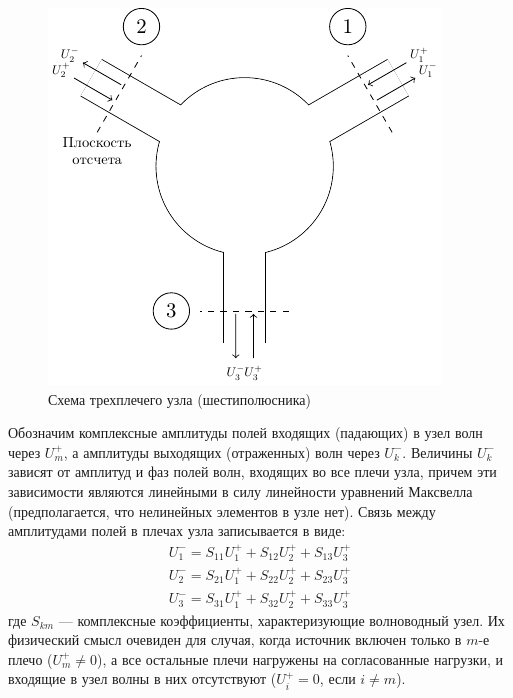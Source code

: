 ﻿\documentclass[a4paper,11pt]{article}
\begin{document}
\begin{figure}[h!]
	\centering
	\includegraphics[scale=1.5]{ris/ris1}
	\caption{Схема трехплечего узла (шестиполюсника)}
	\label{fig:figure1}
\end{figure}

Обозначим комплексные амплитуды полей входящих (падающих) в узел волн через $U_m^+$, а амплитуды выходящих (отраженных) волн через $U_k^-$. 
Величины $U_k^-$ зависят от амплитуд и фаз полей волн, входящих во все плечи узла, причем эти зависимости являются линейными в силу линейности уравнений Максвелла (предполагается, что нелинейных элементов в узле нет). 
Связь между амплитудами полей в плечах узла записывается в виде:
\begin{equation}
	\begin{array} { l } { U _ { 1 } ^ { - } = S _ { 11 } U _ { 1 } ^ { + } + S _ { 12 } U _ { 2 } ^ { + } + S _ { 13 } U _ { 3 } ^ { + } } \\ { U _ { 2 } ^ { - } = S _ { 21 } U _ { 1 } ^ { + } + S _ { 22 } U _ { 2 } ^ { + } + S _ { 23 } U _ { 3 } ^ { + } } \\ { U _ { 3 } ^ { - } = S _ { 31 } U _ { 1 } ^ { + } + S _ { 32 } U _ { 2 } ^ { + } + S _ { 33 } U _ { 3 } ^ { + } } \end{array}
\end{equation}
где $S_{km}$ ---  комплексные коэффициенты, характеризующие волноводный узел. 
Их физический смысл очевиден для случая, когда источник включен только в $m$-е плечо ($U_m^+\ne0$), а все остальные плечи нагружены на согласованные нагрузки, и входящие в узел волны в них отсутствуют ($U_i^+=0$, если $i\ne m$). 
\end{document}
